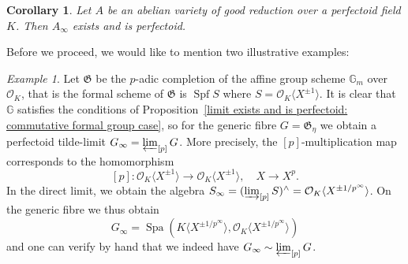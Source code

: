 \documentclass[10pt,oneside]{amsart}
\newtheorem{corollary}[theorem]{Corollary}
\theoremstyle{definition}
\theoremstyle{remark}
\newtheorem*{example}{Example}
\begin{document}
	
	\begin{corollary}\label{tilde limit exists in the good reduction case}
		Let $A$ be an abelian variety of good reduction over a perfectoid field $K$. Then $A_\infty$ exists and is perfectoid.
	\end{corollary}
	 	Before we proceed, we would like to mention two illustrative examples:
	\begin{example}
		Let $\mathfrak G$ be the $p$-adic completion of the affine group scheme $\mathbb G_m$ over $\mathcal O_K$, that is the formal scheme of $\mathfrak G$ is $\operatorname {Spf} S$ where $S=\mathcal O_K\langle X^{\pm 1} \rangle$.  It is clear that $\mathbb G$ satisfies the conditions of Proposition~\ref{limit exists and is perfectoid: commutative formal group case}, so for the generic fibre $G=\mathfrak G_\eta$ we obtain a perfectoid tilde-limit $G_\infty = \varprojlim_{[p]} G$. More precisely, the $[p]$-multiplication map corresponds to the homomorphism
		\[[p]:\mathcal O_K\langle X^{\pm 1} \rangle\rightarrow  \mathcal O_K\langle X^{\pm 1} \rangle, \quad X\rightarrow X^{p}.\]
		In the direct limit, we obtain the algebra $S_\infty = (\varinjlim_{[p]} S)^{\wedge} = \mathcal O_K\langle  X^{\pm 1/p^\infty} \rangle$. On the generic fibre we thus obtain
		\[G_\infty = \operatorname{Spa}(K\langle X^{\pm 1/p^\infty} \rangle,\mathcal O_K\langle X^{\pm 1/p^\infty} \rangle)\]
		and one can verify by hand that we indeed have $G_\infty \sim \varprojlim_{[p]} G$.
	\end{example}
\end{document}
